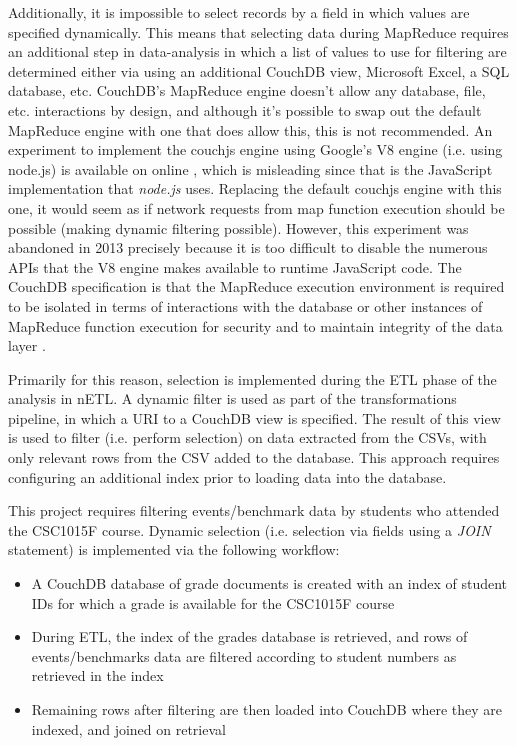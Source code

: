 Additionally, it is impossible to select records by a field in which values are specified dynamically. This means that selecting data during MapReduce requires an additional step in data-analysis in which a list of values to use for filtering are determined either via using an additional CouchDB view, Microsoft Excel, a SQL database, etc. CouchDB's MapReduce engine doesn't allow any database, file, etc. interactions by design, and although it's possible to swap out the default MapReduce engine with one that does allow this, this is not recommended. An experiment to implement the couchjs engine using Google's V8 engine (i.e. using node.js) is available on online \cite{v8couchjs}, which is misleading since that is the JavaScript implementation that \textit{node.js} uses. Replacing the default couchjs engine with this one, it would seem as if network requests from map function execution should be possible (making dynamic filtering possible). However, this experiment was abandoned in 2013 precisely because it is too difficult to disable the numerous APIs that the V8 engine makes available to runtime JavaScript code. The CouchDB specification is that the MapReduce execution environment is required to be isolated in terms of interactions with the database or other instances of MapReduce function execution for security and to maintain integrity of the data layer \cite{slack28Feb}.

Primarily for this reason, selection is implemented during the ETL phase of the analysis in nETL. A dynamic filter is used as part of the transformations pipeline, in which a URI to a CouchDB view is specified. The result of this view is used to filter (i.e. perform selection) on data extracted from the CSVs, with only relevant rows from the CSV added to the database. This approach requires configuring an additional index prior to loading data into the database.

This project requires filtering events/benchmark data by students who attended the CSC1015F course. Dynamic selection (i.e. selection via fields using a \textit{JOIN} statement) is implemented via the following workflow:

\begin{itemize}
    \item A CouchDB database of grade documents is created with an index of student IDs for which a grade is available for the CSC1015F course
    \item During ETL, the index of the grades database is retrieved, and rows of events/benchmarks data are filtered according to student numbers as retrieved in the index
    \item Remaining rows after filtering are then loaded into CouchDB where they are indexed, and joined on retrieval
\end{itemize}

